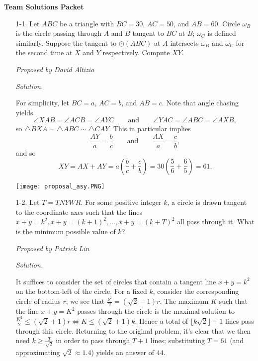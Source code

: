 \documentclass[10pt]{article}
\newcommand{\proposed}[1]
{
\vspace{5pt}
\noindent\textit{Proposed by #1}
}
\newcommand{\solution}
{
\vspace{5pt}
\noindent\textit{Solution.}\qquad
}
\begin{document}
\begin{center}
\huge\textbf{Team Solutions Packet}\normalsize

\vspace{3pt}
\end{center}

\begin{enumerate}

\item[1-1.] Let $ABC$ be a triangle with $BC=30$, $AC=50$, and $AB=60$.  Circle $\omega_B$ is the circle passing through $A$ and $B$ tangent to $BC$ at $B$; $\omega_C$ is defined similarly.  Suppose the tangent to $\odot(ABC)$ at $A$ intersects $\omega_B$ and $\omega_C$ for the second time at $X$ and $Y$ respectively.  Compute $XY$.

\proposed{David Altizio}

\solution
For simplicity, let $BC=a$, $AC=b$, and $AB=c$.  Note that angle chasing yields \[\angle XAB = \angle ACB = \angle AYC\qquad\text{and}\qquad \angle YAC = \angle ABC = \angle AXB,\] so $\triangle BXA\sim\triangle ABC\sim\triangle CAY$.  This in particular implies \[\dfrac{AY}{a} = \dfrac{b}{c}\qquad\text{and}\qquad \dfrac{AX}{a} = \dfrac{c}{b},\] and so \[XY=AX+AY = a\left(\frac bc+\frac cb\right) = 30\left(\frac 56+\frac65\right) = \boxed{61}.\]

\begin{center}
\texttt{[image: proposal\_asy.PNG]}
\end{center}

\item[1-2.] Let $T = TNYWR$. For some positive integer $k$, a circle is drawn tangent to the coordinate axes such that the lines $x + y = k^2, x + y = (k+1)^2, \dots, x+y = (k+T)^2$ all pass through it. What is the minimum possible value of $k$?

\proposed{Patrick Lin}

\solution
It suffices to consider the set of circles that contain a tangent line $x + y = k^2$ on the bottom-left of the circle. For a fixed $k$, consider the corresponding circle of radius $r$; we see that $\tfrac{k^2}{2} = (\sqrt{2} - 1)r$. The maximum $K$ such that the line $x + y = K^2$ passes through the circle is the maximal solution to $\tfrac{K^2}{2} \le (\sqrt{2} + 1)r \iff K \le (\sqrt{2} + 1)k$. Hence a total of $\lfloor k\sqrt{2} \rfloor + 1$ lines pass through this circle. Returning to the original problem, it's clear that we then need $k \ge \frac{T}{\sqrt{2}}$ in order to pass through $T + 1$ lines; substituting $T = 61$ (and approximating $\sqrt{2} \approx 1.4$) yields an answer of $\boxed{44}$.



\end{enumerate}
\end{document}
